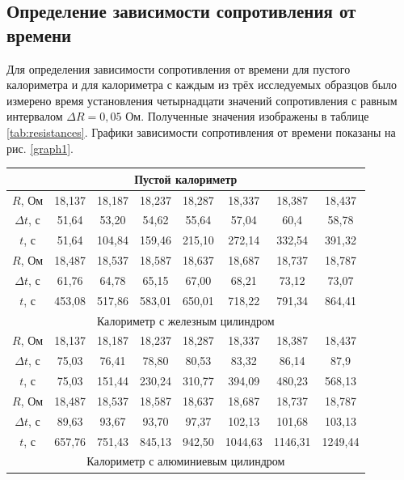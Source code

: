 \documentclass[a4paper,12pt]{article} %
\begin{document}
\subsection{Определение зависимости сопротивления от времени}

Для определения зависимости сопротивления от времени для пустого калориметра и для калориметра с каждым из трёх исследуемых образцов было измерено время установления четырнадцати значений сопротивления с равным интервалом $\Delta R = 0,05$ Ом. Полученные значения изображены в таблице \ref{tab:resistances}. Графики зависимости сопротивления от времени показаны на рис. \ref{graph1}.

\begin{table}[]
    \centering
    \begin{tabular}{|c|c|c|c|c|c|c|c|}\hline
        \multicolumn{8}{|c|}{Пустой калориметр}\\ \hline
        $R$, Ом & 18,137 & 18,187 & 18,237 & 18,287 & 18,337 & 18,387 & 18,437 \\ \hline
        $\Delta t$, с & 51,64 & 53,20 & 54,62 & 55,64 & 57,04 & 60,4 & 58,78 \\ \hline
        $t$, с & 51,64 & 104,84 & 159,46 & 215,10 & 272,14 & 332,54 & 391,32 \\ \hline 
        $R$, Ом & 18,487 & 18,537 & 18,587 & 18,637 & 18,687 & 18,737 & 18,787 \\ \hline
        $\Delta t$, с & 61,76 & 64,78 & 65,15 & 67,00 & 68,21 & 73,12 & 73,07 \\ \hline
        $t$, с & 453,08 & 517,86 & 583,01 & 650,01 & 718,22 & 791,34 & 864,41 \\ \hline 
        \multicolumn{8}{|c|}{Калориметр с железным цилиндром}\\ \hline
        $R$, Ом & 18,137 & 18,187 & 18,237 & 18,287 & 18,337 & 18,387 & 18,437 \\ \hline
        $\Delta t$, с & 75,03 & 76,41 & 78,80 & 80,53 & 83,32 & 86,14 & 87,9 \\ \hline
        $t$, с & 75,03 & 151,44 & 230,24 & 310,77 & 394,09 & 480,23 & 568,13 \\ \hline
        $R$, Ом & 18,487 & 18,537 & 18,587 & 18,637 & 18,687 & 18,737 & 18,787 \\ \hline
        $\Delta t$, с & 89,63 & 93,67 & 93,70 & 97,37 & 102,13 & 101,68 & 103,13 \\ \hline
        $t$, с & 657,76 & 751,43 & 845,13 & 942,50 & 1044,63 & 1146,31 & 1249,44 \\ \hline
        \multicolumn{8}{|c|}{Калориметр с алюминиевым цилиндром}\\ \hline

\end{tabular}
\end{table}
\end{document}
